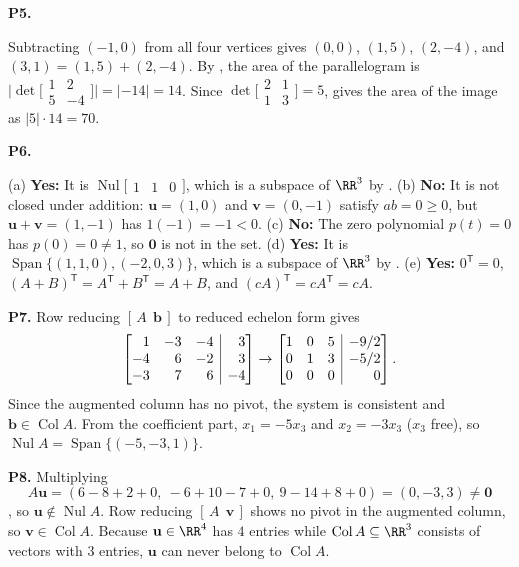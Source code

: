 \documentclass[10pt]{scrartcl}
\makeatletter
\newcommand{\aug}[2]{\left[\begin{array}{@{}#1@{}}#2\end{array}\right]}
\newcommand{\vv}[1]{\mathbf{#1}}
\DeclareMathOperator{\spn}{Span}\DeclareMathOperator{\Nul}{Nul}\DeclareMathOperator{\Col}{Col}
\makeatother
\begin{document}
\begin{prob}\textbf{P5.}\par{}
Subtracting $(-1,0)$ from all four vertices gives $(0,0)$, $(1,5)$, $(2,-4)$, and $(3,1)=(1,5)+(2,-4)$. By , the area of the parallelogram is $\big|\det\bigl[\begin{smallmatrix}1&2\\5&-4\end{smallmatrix}\bigr]\big|=|-14|=14$. Since $\det\bigl[\begin{smallmatrix}2&1\\1&3\end{smallmatrix}\bigr]=5$,  gives the area of the image as $|5|\cdot 14=70$.
\end{prob}

\begin{prob}\textbf{P6.}
\begin{steps}
  \ii (a) \textbf{Yes:} It is $\Nul\bigl[\begin{smallmatrix}1&1&0\end{smallmatrix}\bigr]$, which is a subspace of $\RR^3$ by .
  \ii (b) \textbf{No:} It is not closed under addition: $\vv u=(1,0)$ and $\vv v=(0,-1)$ satisfy $ab=0\ge 0$, but $\vv u+\vv v=(1,-1)$ has $1(-1)=-1<0$.
  \ii (c) \textbf{No:} The zero polynomial $p(t)=0$ has $p(0)=0\ne 1$, so $\vv 0$ is not in the set.
  \ii (d) \textbf{Yes:} It is $\spn\{(1,1,0),(-2,0,3)\}$, which is a subspace of $\RR^3$ by .
  \ii (e) \textbf{Yes:} $0^{\mathsf T}=0$, $(A+B)^{\mathsf T}=A^{\mathsf T}+B^{\mathsf T}=A+B$, and $(cA)^{\mathsf T}=cA^{\mathsf T}=cA$.
\end{steps}
\end{prob}

\begin{prob}\textbf{P7.}
Row reducing $[\,A\ \ \vv b\,]$ to reduced echelon form gives
\[
  \aug{rrr|r}{1&-3&-4&3\\-4&6&-2&3\\-3&7&6&-4} \to \aug{rrr|r}{1&0&5&-9/2\\0&1&3&-5/2\\0&0&0&0}.
\]
Since the augmented column has no pivot, the system is consistent and $\vv b\in\Col A$. From the coefficient part, $x_1=-5x_3$ and $x_2=-3x_3$ ($x_3$ free), so $\Nul A=\spn\{(-5,-3,1)\}$.
\end{prob}

\begin{prob}\textbf{P8.}
Multiplying 
\[
  A\vv u=(6-8+2+0,\ -6+10-7+0,\ 9-14+8+0)=(0,-3,3)\ne\vv 0
\]
, so $\vv u\notin\Nul A$. Row reducing $[\,A\ \ \vv v\,]$ shows no pivot in the augmented column, so $\vv v\in\Col A$. Because $\vv u\in\RR^4$ has $4$ entries while $\Col A\subseteq\RR^3$ consists of vectors with $3$ entries, $\vv u$ can never belong to $\Col A$.
\end{prob}
\end{document}
